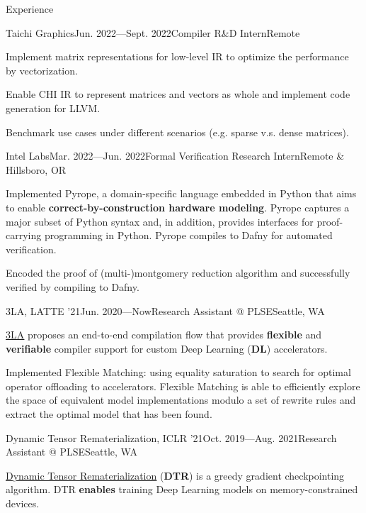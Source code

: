 \documentclass{resume}
\newcommand{\myul}[2][blue]{\setulcolor{#1}\ul{#2}\setulcolor{blue}}
\begin{document}
    \begin{rSection}{Experience}
		\begin{rSubsection}{Taichi Graphics}{Jun. 2022---Sept. 2022}{Compiler R\&D Intern}{Remote}
			\item Implement matrix representations for low-level IR to optimize the performance by vectorization.
			\item Enable CHI IR to represent matrices and vectors as whole and implement code generation for LLVM.
			\item Benchmark use cases under different scenarios (e.g. sparse v.s. dense matrices).
		\end{rSubsection}
		\begin{rSubsection}{Intel Labs}{Mar. 2022---Jun. 2022}{Formal Verification Research Intern}{Remote \& Hillsboro, OR}
			\item Implemented Pyrope, a domain-specific language embedded in Python that aims to enable \textbf{correct-by-construction hardware modeling}. Pyrope captures a major subset of Python syntax and, in addition, provides interfaces for proof-carrying programming in Python. Pyrope compiles to Dafny for automated verification.
            \item Encoded the proof of (multi-)montgomery reduction algorithm and successfully verified by compiling to Dafny.
		\end{rSubsection}
		\vspace{-5pt}
        \begin{rSubsection}{3LA, LATTE '21}{Jun. 2020---Now}{Research Assistant @ PLSE}{Seattle, WA}
            \item \href{https://capra.cs.cornell.edu/latte21/paper/30.pdf}{\color{blue} \myul{3LA}} proposes an end-to-end compilation flow that provides \textbf{flexible} and \textbf{verifiable} compiler support for custom Deep Learning (\textbf{DL}) accelerators.
            \item Implemented Flexible Matching: using equality saturation to search for optimal operator offloading to accelerators. Flexible Matching is able to efficiently explore the space of equivalent model implementations modulo a set of rewrite rules and extract the optimal model that has been found.
        \end{rSubsection}
        \vspace{-5pt}
        \begin{rSubsection}{Dynamic Tensor Rematerialization, ICLR '21}{Oct. 2019---Aug. 2021}{Research Assistant @ PLSE}{Seattle, WA}
            \item \href{https://github.com/uwsampl/dtr-prototype}{\color{blue} \myul{Dynamic Tensor Rematerialization}} (\textbf{DTR}) is a greedy gradient checkpointing algorithm. DTR \textbf{enables} training Deep Learning models on memory-constrained devices.

\end{rSubsection}
\end{rSection}
\end{document}
